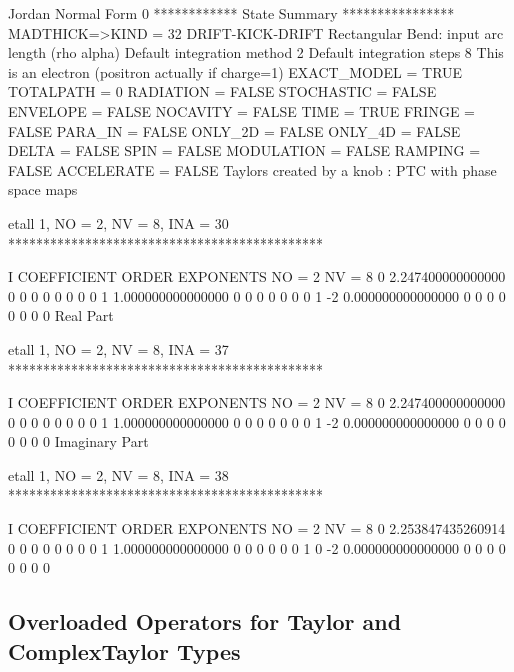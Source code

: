 \documentclass{hitec}     %
\begin{document}
{\begin{code}
  Jordan Normal Form            0
 ************ State Summary ****************
 MADTHICK=>KIND =   32  DRIFT-KICK-DRIFT
  Rectangular Bend: input arc length (rho alpha)
  Default integration method     2
  Default integration steps      8
 This is an electron (positron actually if charge=1)
       EXACT_MODEL =  TRUE
       TOTALPATH   =     0
       RADIATION   =  FALSE
       STOCHASTIC  =  FALSE
       ENVELOPE    =  FALSE
       NOCAVITY    =  FALSE
       TIME        =  TRUE
       FRINGE      =  FALSE
       PARA_IN     =  FALSE
       ONLY_2D     =  FALSE
       ONLY_4D     =  FALSE
       DELTA       =  FALSE
       SPIN        =  FALSE
       MODULATION  =  FALSE
       RAMPING     =  FALSE
       ACCELERATE  =  FALSE
 Taylors created by a knob : PTC with phase space maps

 etall    1, NO =    2, NV =    8, INA =   30
 *********************************************

    I  COEFFICIENT          ORDER   EXPONENTS
      NO =     2      NV =     8
   0   2.247400000000000       0  0  0  0  0  0  0  0
   1   1.000000000000000       0  0  0  0  0  0  0  1
    -2   0.000000000000000       0  0  0  0  0  0  0  0
  Real Part

 etall    1, NO =    2, NV =    8, INA =   37
 *********************************************

    I  COEFFICIENT          ORDER   EXPONENTS
      NO =     2      NV =     8
   0   2.247400000000000       0  0  0  0  0  0  0  0
   1   1.000000000000000       0  0  0  0  0  0  0  1
    -2   0.000000000000000       0  0  0  0  0  0  0  0
  Imaginary Part

 etall    1, NO =    2, NV =    8, INA =   38
 *********************************************

    I  COEFFICIENT          ORDER   EXPONENTS
      NO =     2      NV =     8
   0   2.253847435260914       0  0  0  0  0  0  0  0
   1   1.000000000000000       0  0  0  0  0  0  1  0
    -2   0.000000000000000       0  0  0  0  0  0  0  0
\end{code}

\subsection{Overloaded Operators for Taylor and ComplexTaylor Types}
\label{s:taylor.over}

}
\end{document}
